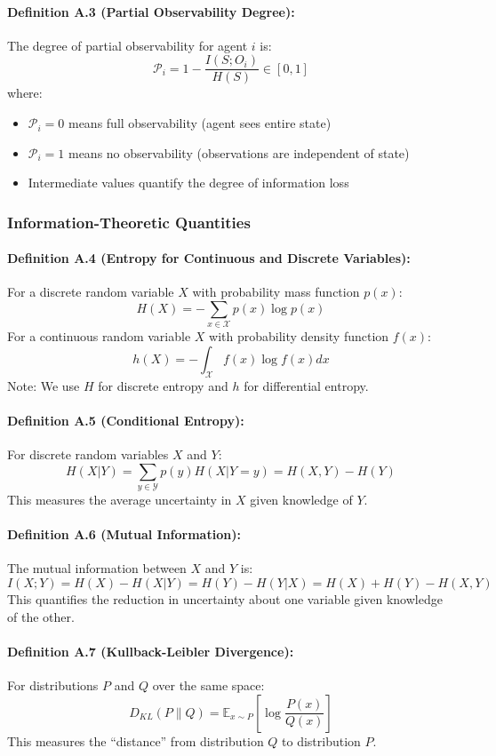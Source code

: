 \documentclass[10pt, letterpaper]{article}
\begin{document}
\paragraph{Definition A.3 (Partial Observability Degree):} The degree of partial observability for agent $i$ is:
\[\mathcal{P}_i = 1 - \frac{I(S; O_i)}{H(S)} \in [0, 1]\]
where:
\begin{itemize}
    \item $\mathcal{P}_i = 0$ means full observability (agent sees entire state)
    \item $\mathcal{P}_i = 1$ means no observability (observations are independent of state)
    \item Intermediate values quantify the degree of information loss
\end{itemize}

\subsubsection{Information-Theoretic Quantities}

\paragraph{Definition A.4 (Entropy for Continuous and Discrete Variables):} For a discrete random variable $X$ with probability mass function $p(x)$:
\[H(X) = -\sum_{x \in \mathcal{X}} p(x) \log p(x)\]
For a continuous random variable $X$ with probability density function $f(x)$:
\[h(X) = -\int_{\mathcal{X}} f(x) \log f(x) dx\]
Note: We use $H$ for discrete entropy and $h$ for differential entropy.

\paragraph{Definition A.5 (Conditional Entropy):} For discrete random variables $X$ and $Y$:
\[H(X|Y) = \sum_{y \in \mathcal{Y}} p(y) H(X|Y=y) = H(X,Y) - H(Y)\]
This measures the average uncertainty in $X$ given knowledge of $Y$.

\paragraph{Definition A.6 (Mutual Information):} The mutual information between $X$ and $Y$ is:
\[I(X;Y) = H(X) - H(X|Y) = H(Y) - H(Y|X) = H(X) + H(Y) - H(X,Y)\]
This quantifies the reduction in uncertainty about one variable given knowledge of the other.

\paragraph{Definition A.7 (Kullback-Leibler Divergence):} For distributions $P$ and $Q$ over the same space:
\[D_{KL}(P \| Q) = \mathbb{E}_{x \sim P} \left[ \log \frac{P(x)}{Q(x)} \right]\]
This measures the ``distance'' from distribution $Q$ to distribution $P$.
\end{document}
